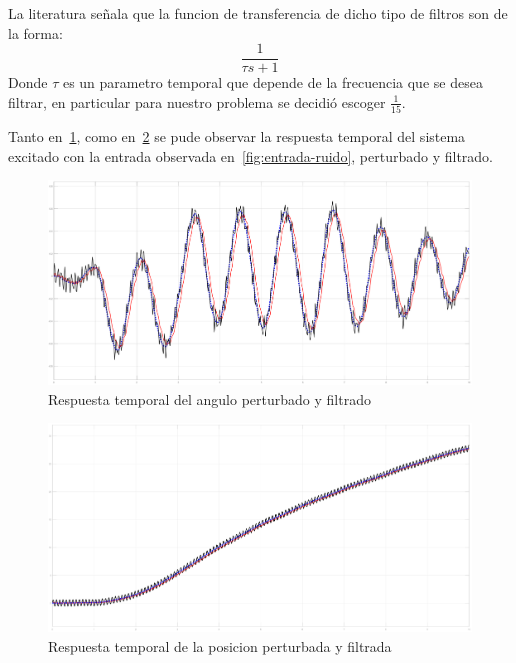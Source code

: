 La literatura señala que la funcion de transferencia de dicho tipo de filtros
son de la forma:
\[
\frac{1}{\tau s + 1}
\]
Donde $\tau $ es un parametro temporal que depende de la frecuencia que se desea
filtrar, en particular para nuestro problema se decidió escoger $\frac{1}{15}$.

Tanto en~\ref{fig:filtro-angle}, como en~\ref{fig:filtro-c} se pude observar la
respuesta temporal del sistema excitado con la entrada observada
en~\ref{fig:entrada-ruido}, perturbado y filtrado.

\begin{figure}[t]
  \label{fig:filtro-angle}
  \includegraphics[scale=1]{Figuras/filtro-angle}
  \caption{Respuesta temporal del angulo perturbado y filtrado} 
\end{figure}

\begin{figure}[t]
  \label{fig:filtro-c}
  \includegraphics[scale=1]{Figuras/filtro-c}
  \caption{Respuesta temporal de la posicion perturbada y filtrada} 
\end{figure}